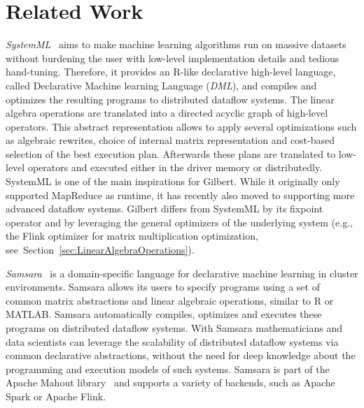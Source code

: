 \section{Related Work}
\label{sec:relatedWork}

{\em SystemML}~\cite{ghoting:2011a,Boehm2014,Boehm2014Hybrid,Schelter2015,Elgohary2016} aims to make machine learning algorithms run on massive datasets without burdening the user with low-level implementation details and tedious hand-tuning. 
Therefore, it provides an R-like declarative high-level language, called Declarative Machine learning Language (\emph{DML}), and compiles and optimizes the resulting programs to distributed dataflow systems. 
The linear algebra operations are translated into a directed acyclic graph of high-level operators. 
This abstract representation allows to apply several optimizations such as algebraic rewrites, choice of internal matrix representation and cost-based selection of the best execution plan. 
Afterwards these plans are translated to low-level operators and executed either in the driver memory or distributedly. 
SystemML is one of the main inspirations for Gilbert. 
While it originally only supported MapReduce as runtime, it has recently also moved to supporting more advanced dataflow systems. 
Gilbert differs from SystemML by its fixpoint operator and by leveraging the general optimizers of the underlying system (e.g., the Flink optimizer for matrix multiplication optimization, see~Section~\ref{sec:LinearAlgebraOperations}). 

{\em Samsara}~\cite{Lyubimov2016,Schelter2016} is a domain-specific language for declarative machine learning in cluster environments. 
Samsara allows its users to specify programs using a set of common matrix abstractions and linear algebraic operations, similar to R or MATLAB.
Samsara automatically compiles, optimizes and executes these programs on distributed dataflow systems. 
With Samsara mathematicians and data scientists can leverage the scalability of distributed dataflow systems via common declarative abstractions, without the need for deep knowledge about the programming and execution models of such systems. 
Samsara is part of the Apache Mahout library~\cite{mahout:2011a} and supports a variety of backends, such as Apache Spark or Apache Flink. 

